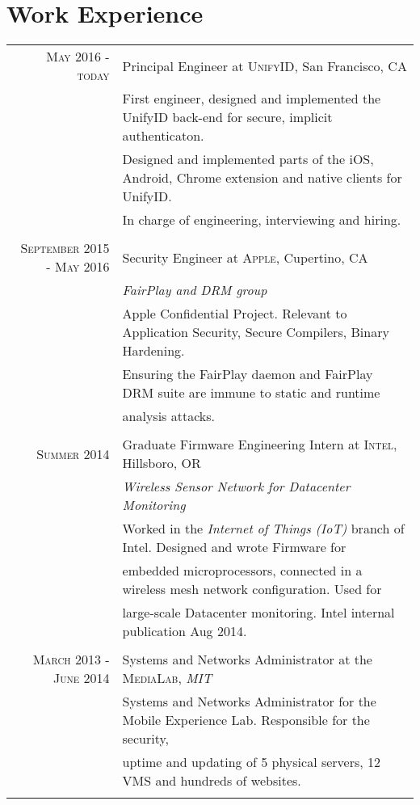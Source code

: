 \documentclass[lettersize,10pt]{article}
\begin{document}
\section{Work Experience}
\begin{tabular}{rl}
\textsc{ May 2016 - today} & Principal Engineer at \textsc{UnifyID}, San Francisco, CA\\
&\footnotesize{First engineer, designed and implemented the UnifyID back-end for secure, implicit authenticaton. }\\
&\footnotesize{Designed and implemented parts of the iOS, Android, Chrome extension and native clients for UnifyID.}\\
&\footnotesize{In charge of engineering, interviewing and hiring.}\\\multicolumn{2}{c}{} \\

\textsc{September 2015 - May 2016} & Security Engineer at \textsc{Apple}, Cupertino, CA \\&\emph{FairPlay and DRM group}\\
&\footnotesize{Apple Confidential Project. Relevant to Application Security, Secure Compilers, Binary Hardening.} \\
&\footnotesize{Ensuring the FairPlay daemon and FairPlay DRM suite are immune to static and runtime }\\
&\footnotesize{analysis attacks.}\\\multicolumn{2}{c}{} \\

\textsc{Summer 2014} & Graduate Firmware Engineering Intern at \textsc{Intel}, Hillsboro, OR \\&\emph{Wireless Sensor Network for Datacenter Monitoring}\\
&\footnotesize{Worked in the \textit{Internet of Things (IoT)} branch of Intel. Designed and wrote Firmware for} \\
&\footnotesize{embedded microprocessors, connected in a wireless mesh network configuration. Used for} \\
&\footnotesize{large-scale Datacenter monitoring. Intel internal publication Aug 2014.}\\\multicolumn{2}{c}{} \\

\textsc{March 2013 - June 2014} & Systems and Networks Administrator at the \textsc{MediaLab},  \emph{MIT}\\
&\footnotesize{Systems and Networks Administrator for the Mobile Experience Lab. Responsible for the security,}\\
&\footnotesize{uptime and updating of 5 physical servers, 12 VMS  and hundreds of websites.}\\\multicolumn{2}{c}{} \\

\end{tabular}
\end{document}
